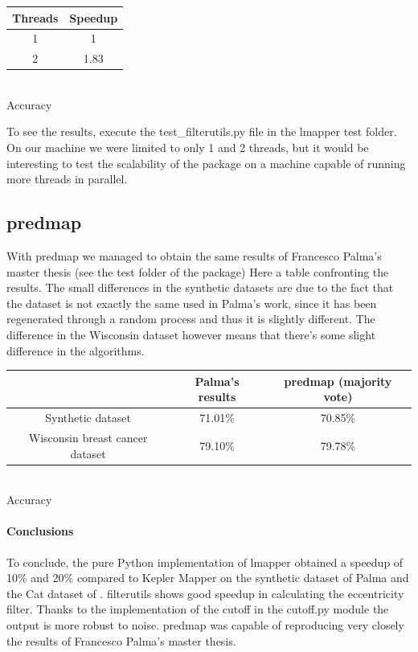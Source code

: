 \begin{center}
	
	\begin{tabular}{ cc } 
		
		Threads & Speedup \\ 
		\hline
		1& 1\\ 
		2 & 1.83 \\ 
	\end{tabular}\\
	\bigskip
	Accuracy
\end{center}

To see the results, execute the test\_filterutils.py file in the lmapper test folder. On our machine we were limited to only 1 and 2 threads, but it would be interesting to test the scalability of the package on a machine capable of running more threads in parallel.
\subsection{predmap}
With predmap we managed to obtain the same results of Francesco Palma's master thesis (see the test folder of the package)
Here a table confronting the results. The small differences in the synthetic datasets are due to the fact that the dataset is not exactly the same used in Palma's work, since it has been regenerated through a random process and thus it is slightly different. The difference in the Wisconsin dataset however means that there's some slight difference in the algorithms. 

\begin{center}
	
	\begin{tabular}{ ccc } 
	
		&Palma's results & predmap (majority vote) \\ 
		\hline
		Synthetic dataset & 71.01\% & 70.85\% \\ 
		Wisconsin breast cancer dataset & 79.10\% & 79.78\% \\ 
	\end{tabular}\\
\bigskip
	Accuracy
\end{center}

\paragraph{Conclusions}
To conclude, the pure Python implementation of lmapper obtained a speedup of 10\% and 20\% compared to Kepler Mapper on the synthetic dataset of Palma and the Cat dataset of \cite{pythonmapper}. filterutils shows good speedup in calculating the eccentricity filter. Thanks to the implementation of the cutoff in the cutoff.py module the output is more robust to noise. predmap was capable of reproducing very closely the results of Francesco Palma's master thesis.
